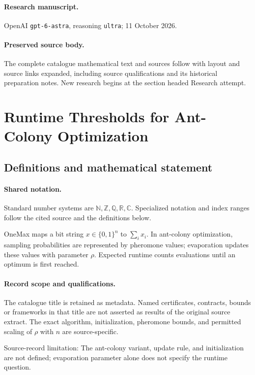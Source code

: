 \documentclass[11pt]{article}
\begin{document}
\paragraph{Research manuscript.} OpenAI \texttt{gpt-6-astra}, reasoning \texttt{ultra}; 11 October 2026.
\paragraph{Preserved source body.} The complete catalogue mathematical text and sources follow with layout and source links expanded, including source qualifications and its historical preparation notes. New research begins at the section headed Research attempt.

\section{Runtime Thresholds for Ant-Colony Optimization}\label{statement}

\subsection{Definitions and mathematical statement}

\paragraph{Shared notation.}Standard number systems are $\mathbb N,\mathbb Z,\mathbb Q,\mathbb R,\mathbb C$. Specialized notation and index ranges follow the cited source and the definitions below.


OneMax maps a bit string $x\in\{0,1\}^n$ to $\sum_i x_i$. In ant-colony optimization, sampling probabilities are represented by pheromone values; evaporation updates these values with parameter $\rho$. Expected runtime counts evaluations until an optimum is first reached.
\paragraph{Record scope and qualifications.}
The catalogue title is retained as metadata. Named certificates, contracts, bounds or frameworks in that title are not asserted as results of the original source extract.
The exact algorithm, initialization, pheromone bounds, and permitted scaling of $\rho$ with $n$ are source-specific.

Source-record limitation: The ant-colony variant, update rule, and initialization are not defined; evaporation parameter alone does not specify the runtime question.
\end{document}
